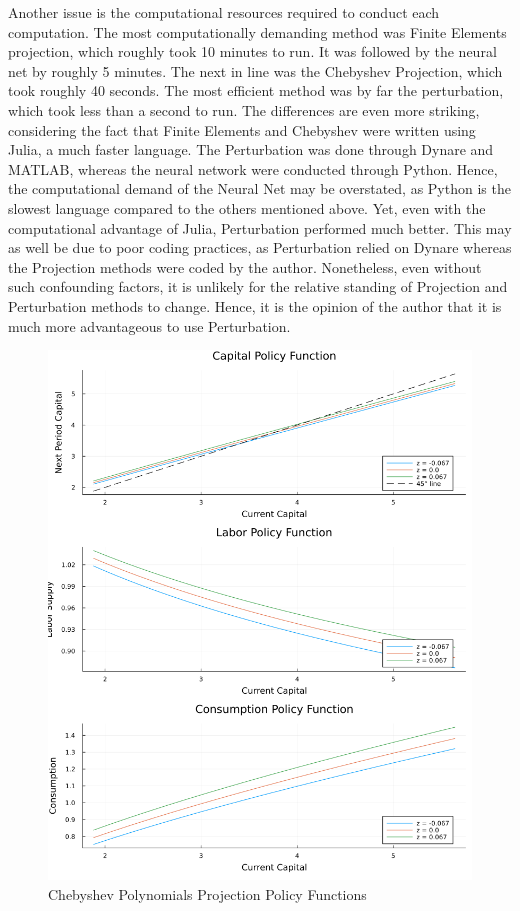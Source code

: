 \documentclass[12pt]{article}
\theoremstyle{plain}
\theoremstyle{definition}
\theoremstyle{remark}
\begin{document}
	Another issue is the computational resources required to conduct each computation. The most computationally demanding method was Finite Elements projection, which roughly took 10 minutes to run. It was followed by the neural net by roughly 5 minutes. The next in line was the Chebyshev Projection, which took roughly 40 seconds. The most efficient method was by far the perturbation, which took less than a second to run. The differences are even more striking, considering the fact that Finite Elements and Chebyshev were written using Julia, a much faster language. The Perturbation was done through Dynare and MATLAB, whereas the neural network were conducted through Python. Hence, the computational demand of the Neural Net may be overstated, as Python is the slowest language compared to the others mentioned above. Yet, even with the computational advantage of Julia, Perturbation performed much better. This may as well be due to poor coding practices, as Perturbation relied on Dynare whereas the Projection methods were coded by the author. Nonetheless, even without such confounding factors, it is unlikely for the relative standing of Projection and Perturbation methods to change. Hence, it is the opinion of the author that it is much more advantageous to use Perturbation. 
	
	\begin{figure}[H]
		\centering
		\includegraphics[width=\textwidth]{q1fin.png}
		\caption{Chebyshev Polynomials Projection Policy Functions}
	\end{figure}
	\pagebreak
	
\end{document}
